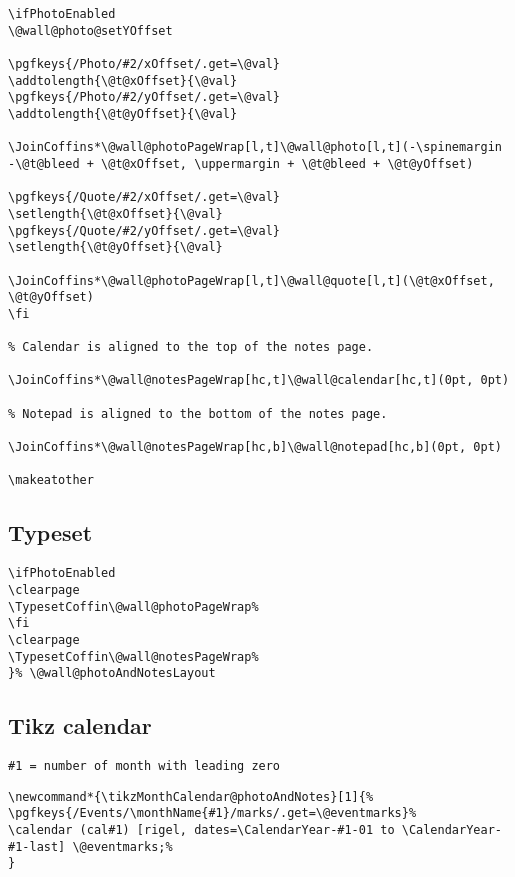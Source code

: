 \documentclass[11pt,oneside]{memoir-article}
\begin{document}
\begin{verbatim}
\ifPhotoEnabled
\@wall@photo@setYOffset

\pgfkeys{/Photo/#2/xOffset/.get=\@val}
\addtolength{\@t@xOffset}{\@val}
\pgfkeys{/Photo/#2/yOffset/.get=\@val}
\addtolength{\@t@yOffset}{\@val}

\JoinCoffins*\@wall@photoPageWrap[l,t]\@wall@photo[l,t](-\spinemargin -\@t@bleed + \@t@xOffset, \uppermargin + \@t@bleed + \@t@yOffset)

\pgfkeys{/Quote/#2/xOffset/.get=\@val}
\setlength{\@t@xOffset}{\@val}
\pgfkeys{/Quote/#2/yOffset/.get=\@val}
\setlength{\@t@yOffset}{\@val}

\JoinCoffins*\@wall@photoPageWrap[l,t]\@wall@quote[l,t](\@t@xOffset, \@t@yOffset)
\fi

% Calendar is aligned to the top of the notes page.

\JoinCoffins*\@wall@notesPageWrap[hc,t]\@wall@calendar[hc,t](0pt, 0pt)

% Notepad is aligned to the bottom of the notes page.

\JoinCoffins*\@wall@notesPageWrap[hc,b]\@wall@notepad[hc,b](0pt, 0pt)

\makeatother
\end{verbatim}

\subsection{Typeset}
\label{sec:orgd0e7514}

\begin{verbatim}
\ifPhotoEnabled
\clearpage
\TypesetCoffin\@wall@photoPageWrap%
\fi
\clearpage
\TypesetCoffin\@wall@notesPageWrap%
}% \@wall@photoAndNotesLayout
\end{verbatim}

\subsection{Tikz calendar}
\label{sec:orgc816799}

\begin{verbatim}
#1 = number of month with leading zero
\end{verbatim}


\begin{verbatim}
\newcommand*{\tikzMonthCalendar@photoAndNotes}[1]{%
\pgfkeys{/Events/\monthName{#1}/marks/.get=\@eventmarks}%
\calendar (cal#1) [rigel, dates=\CalendarYear-#1-01 to \CalendarYear-#1-last] \@eventmarks;%
}
\end{verbatim}
\end{document}
